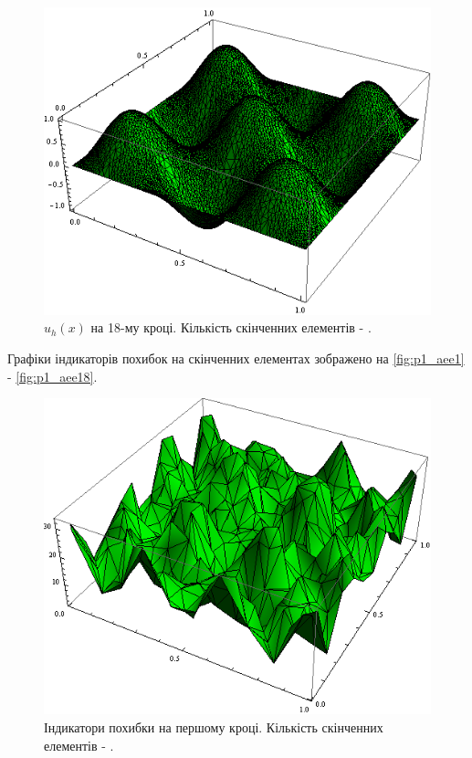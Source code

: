 \begin{figure}[H]
	\centering
    \includegraphics[scale=0.7]{problem1/my/solutions/18}
    \caption{$u_h(x)$ на 18-му кроці. Кількість скінченних елементів - .}
    \label{fig:p1_solution18}
\end{figure}
%
\clearpage
Графіки індикаторів похибок на скінченних елементах зображено на \autoref{fig:p1_aee1} - \autoref{fig:p1_aee18}.
%
\begin{figure}[H]
	\centering
    \includegraphics[scale=0.8]{problem1/my/AEE/1}
    \caption{Індикатори похибки на першому кроці. Кількість скінченних елементів - .}
    \label{fig:p1_aee1}
\end{figure}


